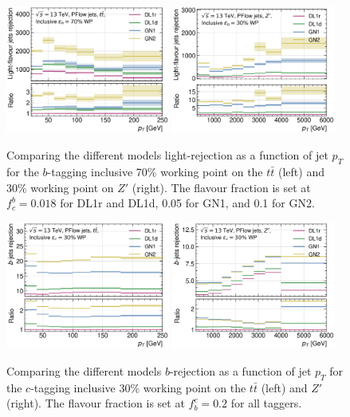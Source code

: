 \begin{figure}[h!]
  \centering
  \includegraphics[width=0.48\textwidth]{Images/FTAG/GN/GN2/pt_plots/pt_ttbar_light_rej.png}
  \includegraphics[width=0.48\textwidth]{Images/FTAG/GN/GN2/pt_plots/pt_zp_light_rej.png}
  \caption{Comparing the different models light-rejection as a function of jet $p_T$ for the $b$-tagging inclusive 70\% working point on the $t\bar{t}$ (left) and 30\% working point on $Z'$ (right). The flavour fraction is set at $f^b_c = 0.018$ for DL1r and DL1d, 0.05 for GN1, and 0.1 for GN2.}
  \label{apfig:GNxptb_urej}
\end{figure} 
\begin{figure}[h!]
  \centering
  \includegraphics[width=0.48\textwidth]{Images/FTAG/GN/GN2/pt_plots/pt_ttbar_b_rej_c.png}
  \includegraphics[width=0.48\textwidth]{Images/FTAG/GN/GN2/pt_plots/pt_zp_b_rej_c.png}
  \caption{Comparing the different models $b$-rejection as a function of jet $p_T$ for the $c$-tagging inclusive 30\% working point on the $t\bar{t}$ (left) and $Z'$ (right). The flavour fraction is set at $f^c_b = 0.2$ for all taggers.}
  \label{apfig:GNxptc_brej}
\end{figure} 
